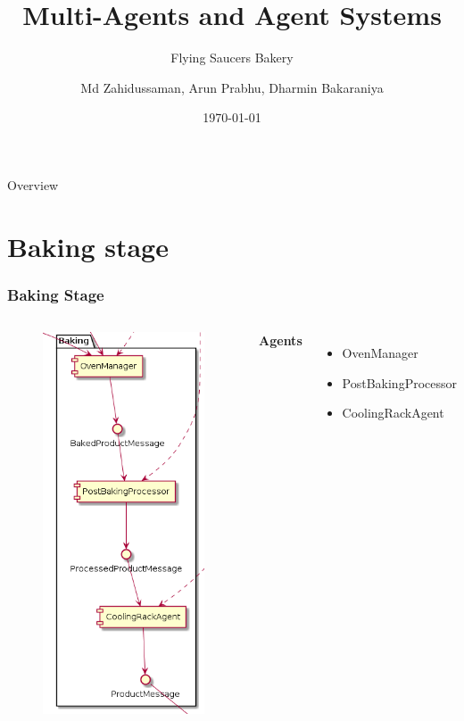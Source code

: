 \documentclass{beamer}
\title{Multi-Agents and Agent Systems}
\subtitle{Flying Saucers Bakery}
\author{Md Zahidussaman, Arun Prabhu, Dharmin Bakaraniya}
\institute{H-BRS}
\date{\today}
\begin{document}
\begin{frame}
    \titlepage
\end{frame}

\begin{frame}{Overview}
    \tableofcontents
\end{frame}

\section{Baking stage}%
\label{sec:baking_stage}
\begin{frame}
    \frametitle{\huge{Baking Stage}}
    \begin{columns}[t]
        \begin{figure}[H]
            \centering
            \includegraphics[width=0.6\linewidth]{baking_component_diagram.png}
        \end{figure}
            \textbf{Agents}
            \begin{itemize}
                \item OvenManager
                \item PostBakingProcessor
                \item CoolingRackAgent
            \end{itemize}
    \end{columns}
\end{frame}
\end{document}
